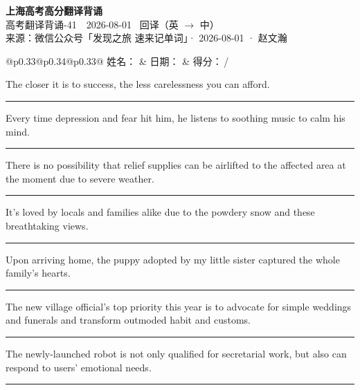 \documentclass[11pt,a4paper]{article}
\newcommand{\num}[1]{\makebox[1.9em][r]{#1.}\hspace{0.3em}}
\newcommand{\wline}{\noindent\rule{\linewidth}{0.4pt}}
\begin{document}
\pagestyle{plain}
\begin{center}
{\LARGE\bfseries 上海高考高分翻译背诵 }\\[0.25em]
{\large 高考翻译背诵-41　2026-08-01 \quad\ 回译（英 $\to$ 中）}\\[0.35em]
{\footnotesize 来源：微信公众号「发现之旅 速来记单词」· 2026-08-01 · 赵文瀚}
\end{center}

\vspace{0.4em}
\noindent\begin{tabular}{@{}p{0.33\textwidth}@{}p{0.34\textwidth}@{}p{0.33\textwidth}@{}}
姓名：\underline{\hspace{2.0cm}} & 日期：\underline{\hspace{2.0cm}} & 得分：\underline{\hspace{1.4cm}}\,/ \\
\end{tabular}

\vspace{0.5em}

\vspace{0.8em}
\num{1}The closer it is to success, the less carelessness you can afford.

\vspace{0.25em}

\wline

\num{2}Every time depression and fear hit him, he listens to soothing music to calm his mind.

\vspace{0.25em}

\wline

\num{3}There is no possibility that relief supplies can be airlifted to the affected area at the moment due to severe weather.

\vspace{0.25em}

\wline

\num{4}It's loved by locals and families alike due to the powdery snow and these breathtaking views.

\vspace{0.25em}

\wline

\num{5}Upon arriving home, the puppy adopted by my little sister captured the whole family’s hearts.

\vspace{0.25em}

\wline

\num{6}The new village official’s top priority this year is to advocate for simple weddings and funerals and transform outmoded habit and customs.

\vspace{0.25em}

\wline

\num{7}The newly-launched robot is not only qualified for secretarial work, but also can respond to users’ emotional needs.

\vspace{0.25em}

\wline
\end{document}
